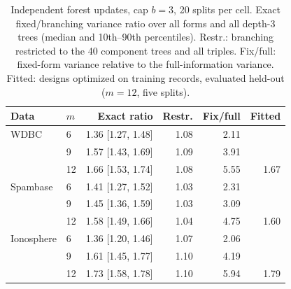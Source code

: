 \begin{table}[t]
\centering
\caption{Independent forest updates, cap $b=3$, 20 splits per cell. Exact fixed/branching variance ratio over all forms and all depth-3 trees (median and 10th--90th percentiles). Restr.: branching restricted to the 40 component trees and all triples. Fix/full: fixed-form variance relative to the full-information variance. Fitted: designs optimized on training records, evaluated held-out ($m=12$, five splits).}
\label{tab:forestexact}
\footnotesize
\setlength{\tabcolsep}{2.6pt}
\begin{tabular}{llrrrr}
\toprule
Data & $m$ & Exact ratio & Restr. & Fix/full & Fitted \\
\midrule
WDBC & 6 & 1.36 [1.27, 1.48] & 1.08 & 2.11 &  \\
 & 9 & 1.57 [1.43, 1.69] & 1.09 & 3.91 &  \\
 & 12 & 1.66 [1.53, 1.74] & 1.08 & 5.55 & 1.67 \\
Spambase & 6 & 1.41 [1.27, 1.52] & 1.03 & 2.31 &  \\
 & 9 & 1.45 [1.36, 1.59] & 1.03 & 3.09 &  \\
 & 12 & 1.58 [1.49, 1.66] & 1.04 & 4.75 & 1.60 \\
Ionosphere & 6 & 1.36 [1.20, 1.46] & 1.07 & 2.06 &  \\
 & 9 & 1.61 [1.45, 1.77] & 1.10 & 4.19 &  \\
 & 12 & 1.73 [1.58, 1.78] & 1.10 & 5.94 & 1.79 \\
\bottomrule
\end{tabular}
\end{table}

